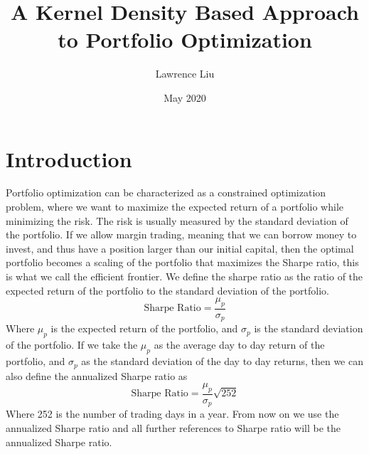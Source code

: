 \documentclass[10pt]{article}
\title{A Kernel Density Based Approach to Portfolio Optimization}
\author{Lawrence Liu}
\date{May 2020}
\begin{document}
\maketitle
\section{Introduction}
Portfolio optimization can be characterized as a constrained optimization problem, where we want to maximize the expected return 
of a portfolio while minimizing the risk. The risk is usually measured by the standard deviation of the portfolio. If we allow margin trading,
meaning that we can borrow money to invest, and thus have a position larger than our initial capital, then the optimal 
portfolio becomes a scaling of the portfolio that maximizes the Sharpe ratio, this is what we call the efficient frontier. We define the 
sharpe ratio as the ratio of the expected return of the portfolio to the standard deviation of the portfolio.
\begin{equation}
    \text{Sharpe Ratio} = \frac{\mu_p}{\sigma_p}
\end{equation}
Where $\mu_p$ is the expected return of the portfolio, and $\sigma_p$ is the standard deviation of the portfolio. If we take the $\mu_p$
as the average day to day return of the portfolio, and $\sigma_p$ as the standard deviation of the day to day returns, then we can 
also define the annualized Sharpe ratio as
\begin{equation}
    \text{Sharpe Ratio} = \frac{\mu_p}{\sigma_p}\sqrt{252}
\end{equation}
Where 252 is the number of trading days in a year. From now on we use the annualized Sharpe ratio and all further references 
to Sharpe ratio will be the annualized Sharpe ratio.
\end{document}
